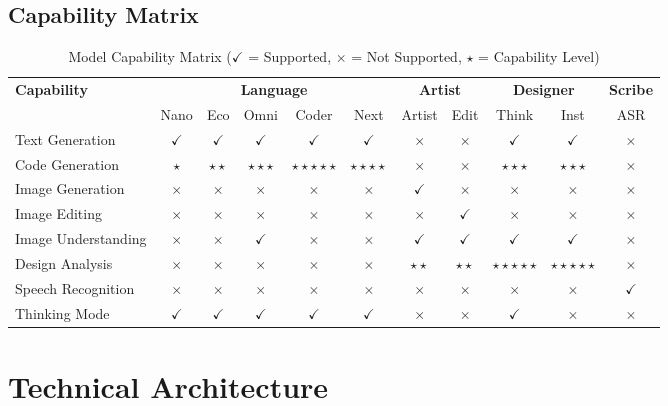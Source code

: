 \documentclass[11pt,a4paper]{article}
\begin{document}
\subsection{Capability Matrix}

\begin{table}[H]
\centering
\footnotesize
\begin{tabular}{l|ccccc|cc|cc|c}
\toprule
\textbf{Capability} & \multicolumn{5}{c|}{\textbf{Language}} & \multicolumn{2}{c|}{\textbf{Artist}} & \multicolumn{2}{c|}{\textbf{Designer}} & \textbf{Scribe} \\
& Nano & Eco & Omni & Coder & Next & Artist & Edit & Think & Inst & ASR \\
\midrule
Text Generation & $\checkmark$ & $\checkmark$ & $\checkmark$ & $\checkmark$ & $\checkmark$ & $\times$ & $\times$ & $\checkmark$ & $\checkmark$ & $\times$ \\
Code Generation & $\star$ & $\star\star$ & $\star\star\star$ & $\star\star\star\star\star$ & $\star\star\star\star$ & $\times$ & $\times$ & $\star\star\star$ & $\star\star\star$ & $\times$ \\
Image Generation & $\times$ & $\times$ & $\times$ & $\times$ & $\times$ & $\checkmark$ & $\times$ & $\times$ & $\times$ & $\times$ \\
Image Editing & $\times$ & $\times$ & $\times$ & $\times$ & $\times$ & $\times$ & $\checkmark$ & $\times$ & $\times$ & $\times$ \\
Image Understanding & $\times$ & $\times$ & $\checkmark$ & $\times$ & $\times$ & $\checkmark$ & $\checkmark$ & $\checkmark$ & $\checkmark$ & $\times$ \\
Design Analysis & $\times$ & $\times$ & $\times$ & $\times$ & $\times$ & $\star\star$ & $\star\star$ & $\star\star\star\star\star$ & $\star\star\star\star\star$ & $\times$ \\
Speech Recognition & $\times$ & $\times$ & $\times$ & $\times$ & $\times$ & $\times$ & $\times$ & $\times$ & $\times$ & $\checkmark$ \\
Thinking Mode & $\checkmark$ & $\checkmark$ & $\checkmark$ & $\checkmark$ & $\checkmark$ & $\times$ & $\times$ & $\checkmark$ & $\times$ & $\times$ \\
\bottomrule
\end{tabular}
\caption{Model Capability Matrix ($\checkmark$ = Supported, $\times$ = Not Supported, $\star$ = Capability Level)}
\end{table}

\section{Technical Architecture}
\end{document}
